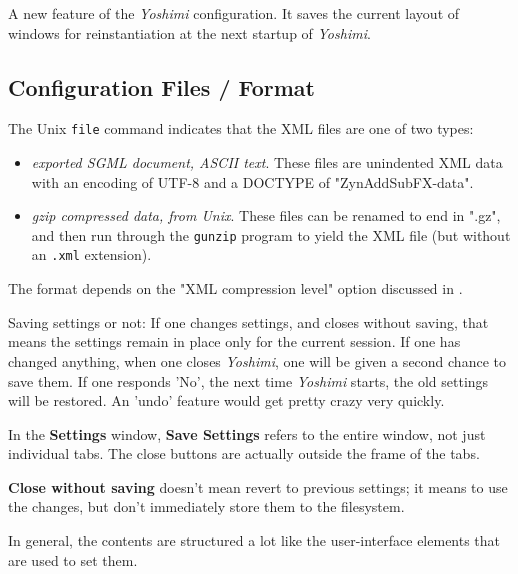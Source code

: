   A new feature of the \textsl{Yoshimi} configuration.  It saves the current
   layout of windows for reinstantiation at the next startup of
   \textsl{Yoshimi}.

\subsection{Configuration Files / Format}
\label{subsec:configuration_file_format}

   The Unix \texttt{file} command indicates that the XML files are one of
   two types:

   \begin{itemize}
      \item \textsl{exported SGML document, ASCII text}.
         These files are unindented XML data with an encoding of UTF-8 and
         a DOCTYPE of "ZynAddSubFX-data".
      \item \textsl{gzip compressed data, from Unix}.
         These files can be renamed to end in ".gz", and then run through
         the \texttt{gunzip} program to yield the XML file (but without an
         \texttt{.xml} extension).
   \end{itemize}

   The format depends on the "XML compression level" option discussed in
   .

   Saving settings or not:
   If one changes settings, and closes without saving, that means the settings
   remain in place only for the current session. If one has changed anything,
   when one closes \textsl{Yoshimi}, one will be given a second chance to
   save them. If one responds 'No',  the next time \textsl{Yoshimi} starts,
   the old settings will be restored.  An 'undo' feature would get pretty
   crazy very quickly.

   In the \textbf{Settings} window, \textbf{Save Settings}
   refers to the entire window, not just individual tabs. The close buttons are
   actually outside the frame of the tabs.

   \textbf{Close without saving} doesn't mean revert to previous settings; it
   means to use the changes, but don't immediately store them to the
   filesystem.

   In general, the contents are structured a lot like the
   user-interface elements that are used to set them.

